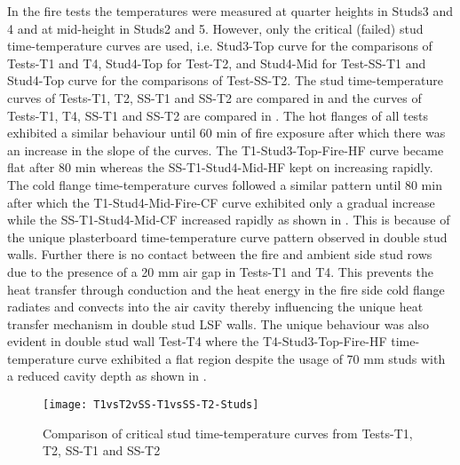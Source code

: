 In the fire tests the temperatures were measured at quarter heights in Studs3 and 4 and at mid-height in Studs2 and 5. However, only the critical (failed) stud time-temperature curves are used, i.e. Stud3-Top curve for the comparisons of Tests-T1 and T4, Stud4-Top for Test-T2, and Stud4-Mid for Test-SS-T1 and Stud4-Top curve for the comparisons of Test-SS-T2. The stud time-temperature curves of Tests-T1, T2, SS-T1 and SS-T2 are compared in  and the curves of Tests-T1, T4, SS-T1 and SS-T2 are compared in . The hot flanges of all tests exhibited a similar behaviour until 60 min of fire exposure after which there was an increase in the slope of the curves. The T1-Stud3-Top-Fire-HF curve became flat after 80 min whereas the SS-T1-Stud4-Mid-HF kept on increasing rapidly. The cold flange time-temperature curves followed a similar pattern until 80 min after which the T1-Stud4-Mid-Fire-CF curve exhibited only a gradual increase while the SS-T1-Stud4-Mid-CF increased rapidly as shown in . This is because of the unique plasterboard time-temperature curve pattern observed in double stud walls. Further there is no contact between the fire and ambient side stud rows due to the presence of a 20 mm air gap in Tests-T1 and T4. This prevents the heat transfer through conduction and the heat energy in the fire side cold flange radiates and convects into the air cavity thereby influencing the unique heat transfer mechanism in double stud LSF walls. The unique behaviour was also evident in double stud wall Test-T4 where the T4-Stud3-Top-Fire-HF time-temperature curve exhibited a flat region despite the usage of 70 mm studs with a reduced cavity depth as shown in .
\begin{figure}[!htbp]
	\centering
		\texttt{[image: T1vsT2vSS-T1vsSS-T2-Studs]}  
	\caption{Comparison of critical stud time-temperature curves from Tests-T1, T2, SS-T1 and SS-T2}
	\label{fig:T1vsT2vSS-T1vsSS-T2-Studs}
\end{figure}

